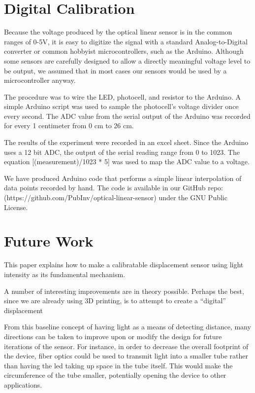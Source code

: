 \documentclass[10pt,conference,compsocconf]{IEEEtran}
\begin{document}
\section{Digital Calibration}

Because the voltage produced by the optical linear sensor is in the common ranges of 0-5V, it is easy to digitize the signal with a standard Analog-to-Digital converter or common hobbyist microcontrollers, such as the Arduino. Although some sensors are carefully designed to allow a directly meaningful voltage level to be output, we assumed that in most cases our sensors would be used by a microcontroller anyway.

The procedure was to wire the LED, photocell, and resistor to the Arduino. A simple Arduino script was used to sample the photocell’s voltage divider once every second. The ADC value from the serial output of the Arduino was recorded for every 1 centimeter from 0 cm to 26 cm.

The results of the experiment were recorded in an excel sheet. Since the Arduino uses a 12 bit ADC, the output of the serial reading range from 0 to 1023. The equation [(measurement)/1023 * 5] was used to map the ADC value to a voltage. 

We have produced Arduino code that performs a simple linear interpolation of data points recorded by hand. The code is available in our GitHub repo: (https://github.com/PubInv/optical-linear-sensor) under the GNU Public License.

\section{Future Work}

This paper explains how to make a calibratable displacement sensor using light intensity as its fundamental mechanism.  

A number of interesting improvements are in theory possible. Perhaps the best, since we are already using 3D printing, is to attempt to create a “digital” displacement 


From this baseline concept of having light as a means of detecting distance, many directions can be taken to improve upon or modify the design for future iterations of the sensor. For instance, in order to decrease the overall footprint of the device, fiber optics could be used to transmit light into a smaller tube rather than having the led taking up space in the tube itself. This would make the circumference of the tube smaller, potentially opening the device to other applications. 
\end{document}
